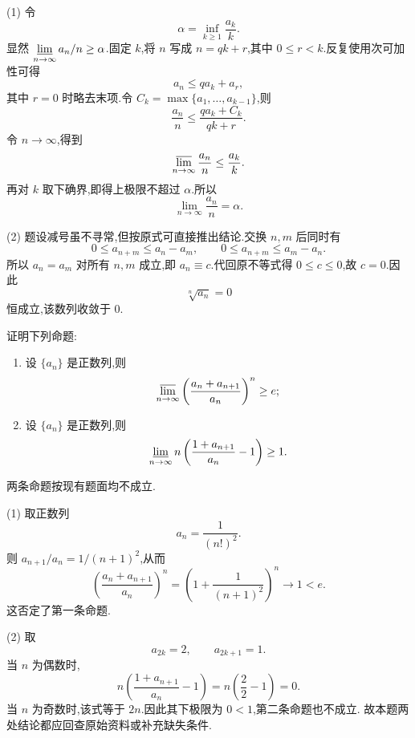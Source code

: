 \begin{solution}
  (1) 令
  \[
    \alpha=\inf\limits_{k\geq1}\dfrac{a_k}{k}.
  \]
  显然 $\varliminf\limits_{n\to\infty}a_n/n\geq\alpha$.固定 $k$,将
  $n$ 写成 $n=qk+r$,其中 $0\leq r<k$.反复使用次可加性可得
  \[
    a_n\leq qa_k+a_r,
  \]
  其中 $r=0$ 时略去末项.令 $C_k=\max\{a_1,\ldots,a_{k-1}\}$,则
  \[
    \dfrac{a_n}{n}\leq\dfrac{qa_k+C_k}{qk+r}.
  \]
  令 $n\to\infty$,得到
  \[
    \varlimsup\limits_{n\to\infty}\dfrac{a_n}{n}\leq\dfrac{a_k}{k}.
  \]
  再对 $k$ 取下确界,即得上极限不超过 $\alpha$.所以
  \[
    \lim\limits_{n\to\infty}\dfrac{a_n}{n}=\alpha.
  \]

  (2) 题设减号虽不寻常,但按原式可直接推出结论.交换 $n,m$ 后同时有
  \[
    0\leq a_{n+m}\leq a_n-a_m,
    \qquad
    0\leq a_{n+m}\leq a_m-a_n.
  \]
  所以 $a_n=a_m$ 对所有 $n,m$ 成立,即 $a_n\equiv c$.代回原不等式得
  $0\leq c\leq0$,故 $c=0$.因此
  \[
    \sqrt[n]{a_n}=0
  \]
  恒成立,该数列收敛于 $0$.
\end{solution}

\begin{example}
  证明下列命题:
  \begin{enumerate}
    \item 设 $\{a_n\}$ 是正数列,则
          \[
            \varlimsup\limits_{n\to\infty}
            \left(\dfrac{a_n+a_{n+1}}{a_n}\right)^n
            \geq e;
          \]
    \item 设 $\{a_n\}$ 是正数列,则
          \[
            \varliminf\limits_{n\to\infty}
            n\left(\dfrac{1+a_{n+1}}{a_n}-1\right)
            \geq1.
          \]
  \end{enumerate}
\end{example}
\exampleblank

\begin{solution}
  两条命题按现有题面均不成立.

  (1) 取正数列
  \[
    a_n=\dfrac{1}{(n!)^2}.
  \]
  则 $a_{n+1}/a_n=1/(n+1)^2$,从而
  \[
    \left(\dfrac{a_n+a_{n+1}}{a_n}\right)^n
    =\left(1+\dfrac{1}{(n+1)^2}\right)^n\longrightarrow1<e.
  \]
  这否定了第一条命题.

  (2) 取
  \[
    a_{2k}=2,
    \qquad a_{2k+1}=1.
  \]
  当 $n$ 为偶数时,
  \[
    n\left(\dfrac{1+a_{n+1}}{a_n}-1\right)
    =n\left(\dfrac{2}{2}-1\right)=0.
  \]
  当 $n$ 为奇数时,该式等于 $2n$.因此其下极限为 $0<1$,第二条命题也不成立.
  故本题两处结论都应回查原始资料或补充缺失条件.
\end{solution}
